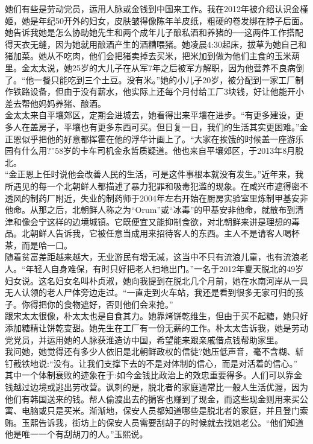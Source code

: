 她们有些是劳动党员，运用人脉或金钱到中国来工作。我在2012年被介绍认识金槿姬，她是年纪50开外的妇女，皮肤皱得像陈年羊皮纸，粗硬的卷发绑在脖子后面。她告诉我她是怎么协助她先生和两个成年儿子酿私酒和养猪的──这两件工作搭配得天衣无缝，因为她就用酿酒产生的酒糟喂猪。她凌晨4:30起床，拔草为她自己和猪加菜。她从不吃肉，他们会把猪卖掉去买米，把米加到做为他们主食的玉米葫里。金太太说，她25岁的大儿子在从军7年之后被军方解职，因为他营养不良病倒了。“他一餐只能吃到三个土豆。没有米。”她的小儿子20岁，被分配到一家工厂制作铁路设备，但由于没有薪水，他实际上还每个月付给工厂3块钱，好让他能开小差去帮他妈妈养猪、酿酒。\\

金太太来自平壤郊区，定期会进城去，她看得出来平壤在进步。“有更多建设，更多人在盖房子，平壤也有更多东西可买。但日复一日，我们的生活其实更困难。”金正恩似乎把他的好意都挥霍在他的浮华计画上了。“大家在挨饿的时候盖一座游乐园有什么用?”58岁的卡车司机金永哲质疑道。他也来自平壤郊区，于2013年8月脱北。\\

“金正恩上任时说他会改善人民的生活，可是这件事根本就没有发生。”近年来，我所遇见的每一个北朝鲜人都描述了暴力犯罪和吸毒犯滥的现象。在咸兴市遮得密不透风的制药厂附近，失业的制药师于2004年左右开始在厨房实验室里炼制甲基安非他命。从那之后，北朝鲜人称之为“Orum”或“冰毒”的甲基安非他命，就散布到清津和像会宁这样的边境城镇。它既便宜又能抑制食欲，对北朝鲜来讲是理想的毒品。北朝鲜人告诉我，它被任意当成用来招待客人的东西。主人不是请客人喝杯茶，而是哈一口。\\

随着贫富差距越来越大，无业游民有增无减，这当中不只有流浪儿童，也有流浪老人。“年轻人自身难保，有时只好把老人扫地出门。”一名于2012年夏天脱北的49岁妇女说。这名妇女名叫朴贞淑，她向我提到在脱北几个月前，她在水南河岸从一具无人认领的老人尸体旁边走过。“一直走到火车站，我还是看到很多无家可归的孩子。你得把你的食物遮好，否则他们会来抢。”\\

跟宋太太很像，朴太太也是自食其力。她靠烤饼乾维生，但由于买不起糖，她只好添加糖精让饼乾变甜。她先生在工厂有一份无薪的工作。朴太太告诉我，她是劳动党党员，并运用她的人脉获淮造访中国，希望能来跟亲戚借点钱帮助家里。\\

我问她，她觉得还有多少人依旧是北朝鲜政权的信徒?她压低声音，毫不含糊、斩钉截铁地说:“没有。让我们支撑下去的不是对体制的信心，而是对活着的信心。”\\

其中一个体制衰败的迹象在于:如今金钱比政治上的效忠重要得多。人们可以靠金钱越过边境或逃出劳改营。讽刺的是，脱北者的家庭通常比一般人生活优渥，因为他们有韩国送来的钱。帮人偷渡出去的掮客也赚到了现金，而这些现金则用来买公寓、电脑或只是买米。渐渐地，保安人员都知道哪些是脱北者的家庭，并且登门索贿。玉熙告诉我，街坊上的保安人员需要刮胡子的时候就去找她老公。“他们知道他是唯一一个有刮胡刀的人。”玉熙说。\\

